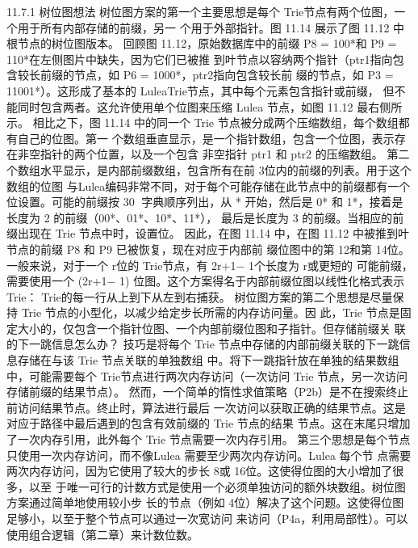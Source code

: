 11.7.1 树位图想法
树位图方案的第一个主要思想是每个 Trie节点有两个位图，一个用于所有内部存储的前缀，另一
个用于外部指针。图 11.14 展示了图 11.12 中根节点的树位图版本。
回顾图 11.12，原始数据库中的前缀 P8 = 100*和 P9 = 110*在左侧图片中缺失，因为它们已被推
到叶节点以容纳两个指针（ptr1指向包含较长前缀的节点，如 P6 = 1000*，ptr2指向包含较长前
缀的节点，如 P3 = 11001*）。这形成了基本的 LuleaTrie节点，其中每个元素包含指针或前缀，
但不能同时包含两者。这允许使用单个位图来压缩 Lulea 节点，如图 11.12 最右侧所示。
相比之下，图 11.14 中的同一个 Trie 节点被分成两个压缩数组，每个数组都有自己的位图。第一
个数组垂直显示，是一个指针数组，包含一个位图，表示存在非空指针的两个位置，以及一个包含
非空指针 ptr1 和 ptr2 的压缩数组。
第二个数组水平显示，是内部前缀数组，包含所有在前 3位内的前缀的列表。用于这个数组的位图
与Lulea编码非常不同，对于每个可能存储在此节点中的前缀都有一个位设置。可能的前缀按
                                                                                          30
字典顺序列出，从 * 开始，然后是 0* 和 1*，接着是长度为 2 的前缀（00*、01*、10*、11*），
最后是长度为 3 的前缀。当相应的前缀出现在 Trie 节点中时，设置位。
因此，在图 11.14 中，在图 11.12 中被推到叶节点的前缀 P8 和 P9 已被恢复，现在对应于内部前
缀位图中的第 12和第 14位。一般来说，对于一个 r位的 Trie节点，有 2r+1− 1个长度为 r或更短的
可能前缀，需要使用一个 (2r+1− 1) 位图。这个方案得名于内部前缀位图以线性化格式表示 Trie：
Trie的每一行从上到下从左到右捕获。
树位图方案的第二个思想是尽量保持 Trie 节点的小型化，以减少给定步长所需的内存访问量。因
此，Trie 节点是固定大小的，仅包含一个指针位图、一个内部前缀位图和子指针。但存储前缀关
联的下一跳信息怎么办？
技巧是将每个 Trie 节点中存储的内部前缀关联的下一跳信息存储在与该 Trie 节点关联的单独数组
中。将下一跳指针放在单独的结果数组中，可能需要每个 Trie节点进行两次内存访问（一次访问
Trie 节点，另一次访问存储前缀的结果节点）。
然而，一个简单的惰性求值策略（P2b）是不在搜索终止前访问结果节点。终止时，算法进行最后
一次访问以获取正确的结果节点。这是对应于路径中最后遇到的包含有效前缀的 Trie 节点的结果
节点。这在末尾只增加了一次内存引用，此外每个 Trie 节点需要一次内存引用。
第三个思想是每个节点只使用一次内存访问，而不像Lulea 需要至少两次内存访问。Lulea 每个节
点需要两次内存访问，因为它使用了较大的步长 8或 16位。这使得位图的大小增加了很多，以至
于唯一可行的计数方式是使用一个必须单独访问的额外块数组。树位图方案通过简单地使用较小步
长的节点（例如 4位）解决了这个问题。这使得位图足够小，以至于整个节点可以通过一次宽访问
来访问（P4a，利用局部性）。可以使用组合逻辑（第二章）来计数位数。

